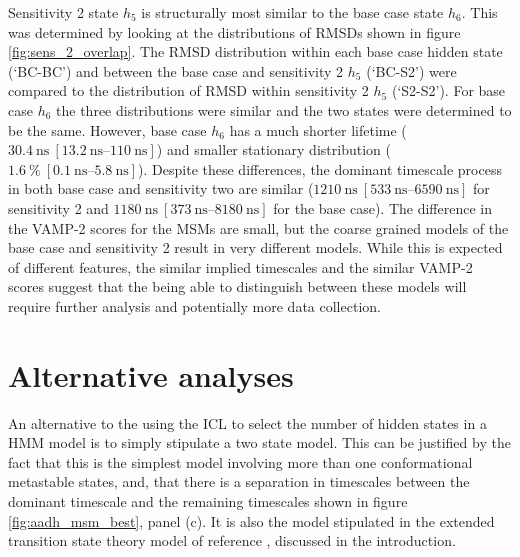 Sensitivity 2 state $h_{5}$ is structurally most similar to the base case state $h_{6}$. This was determined by looking at the distributions of RMSDs shown in figure \ref{fig:sens_2_overlap}. The RMSD distribution within each base case hidden state (`BC-BC') and between the base case and sensitivity 2 $h_{5}$ (`BC-S2') were compared to the distribution of RMSD within sensitivity 2 $h_{5}$ (`S2-S2'). For base case $h_{6}$ the three distributions were similar and the two states were determined to be the same.  However, base case $h_{6}$ has a much shorter lifetime ($\SI{30.4}{\nano\second}\ [\SIrange[range-phrase=\text{--}]{13.2}{110}{\nano\second}]$) and smaller stationary distribution ($\SI{1.6}{\percent}\ [\SIrange[range-phrase=\text{--}]{0.1}{5.8}{\nano\second}]$). Despite these differences, the dominant timescale process in both base case and sensitivity two are similar ($\SI{1210}{\nano\second}\ [\SIrange[range-phrase=\text{--}]{533}{6590}{\nano\second}]$ for sensitivity 2 and  $\SI{1180}{\nano\second}\ [\SIrange[range-phrase=\text{--}]{373}{8180}{\nano\second}]$ for the base case). The difference in the VAMP-2 scores for the MSMs are small, but the coarse grained models of the base case and sensitivity 2 result in very different models. While this is expected of different features, the similar implied timescales  and the similar VAMP-2 scores suggest that the being able to distinguish between these models will require further analysis and potentially more data collection. 


\section{Alternative analyses}\label{sec:outlook}

An alternative to the using the ICL to select the number of hidden states in a HMM model is to simply stipulate a two state model. This can be justified by the fact that this is the simplest model involving more than one conformational metastable states, and, that there is a separation in timescales between the dominant timescale and the remaining timescales shown in figure \ref{fig:aadh_msm_best}, panel (c). It is also the model stipulated in the extended transition state theory model of reference \cite{glowackiProteinDynamicsEnzyme2012, glowackiTakingOckhamRazor2012b}, discussed in the introduction. 

